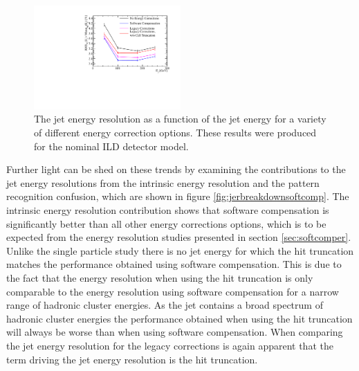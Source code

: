 \begin{figure}[h!]
\includegraphics[width=0.5\textwidth]{EnergyEstimators/Plots/SoftComp/JetEnergyResolution/JER_vs_JetEnergy_Default.pdf}
\caption[The jet energy resolution as a function of the jet energy for a variety of different energy correction options.  These results were produced for the nominal ILD detector model.]{The jet energy resolution as a function of the jet energy for a variety of different energy correction options.  These results were produced for the nominal ILD detector model.}
\label{fig:jersoftcomp}
\end{figure}

Further light can be shed on these trends by examining the contributions to the jet energy resolutions from the intrinsic energy resolution and the pattern recognition confusion, which are shown in figure \ref{fig:jerbreakdownsoftcomp}.  The intrinsic energy resolution contribution shows that software compensation is significantly better than all other energy corrections options, which is to be expected from the energy resolution studies presented in section \ref{sec:softcomper}.  Unlike the single particle study there is no jet energy for which the hit truncation matches the performance obtained using software compensation.  This is due to the fact that the energy resolution when using the hit truncation is only comparable to the energy resolution using software compensation for a narrow range of hadronic cluster energies.  As the jet contains a broad spectrum of hadronic cluster energies the performance obtained when using the hit truncation will always be worse than when using software compensation.  When comparing the jet energy resolution for the legacy corrections is again apparent that the term driving the jet energy resolution is the hit truncation.

